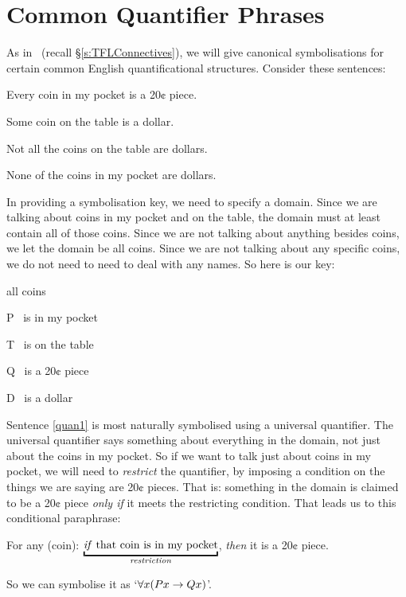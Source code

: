 \section{Common Quantifier Phrases}
As in \TFL\ (recall §\ref{s:TFLConnectives}), we will give canonical symbolisations for certain common English quantificational structures.
Consider these sentences:
	\begin{earg}
		\item[\ex{quan1}] Every coin in my pocket is a 20¢ piece.
		\item[\ex{quan2}] Some coin on the table is a dollar.
		\item[\ex{quan3}] Not all the coins on the table are dollars.
		\item[\ex{quan4}] None of the coins in my pocket are dollars.
	\end{earg}
In providing a symbolisation key, we need to specify a domain. Since we are talking about coins in my pocket and on the table, the domain must at least contain all of those coins. Since we are not talking about anything besides coins, we let the domain be all coins. Since we are not talking about any specific coins, we do not need to need to deal with any names. So here is our key:
	\begin{ekey}
		\item[\text{domain}] all coins
		\item[P] \blank\ is in my pocket
		\item[T] \blank\ is on the table
		\item[Q] \blank\ is a 20¢ piece
		\item[D] \blank\ is a dollar
	\end{ekey}
Sentence \ref{quan1} is most naturally symbolised using a universal quantifier. The universal quantifier says something about everything in the domain, not just about the coins in my pocket. So if we want to talk just about coins in my pocket, we will need to \emph{restrict} the quantifier, by imposing a condition on the things we are saying are 20¢ pieces. That is: something in the domain is claimed to be a 20¢ piece \emph{only if} it meets the restricting condition. That leads us to this conditional paraphrase: \begin{earg}
	\item[\ex{coinpa}] For any (coin): $\underbracket{\text{\emph{if} that coin is in my pocket}}_{\text{\emph{restriction}}}$, \emph{then} it is a 20¢ piece.
\end{earg} So we can symbolise it as `$\forall x(Px \rightarrow Qx)$'.

